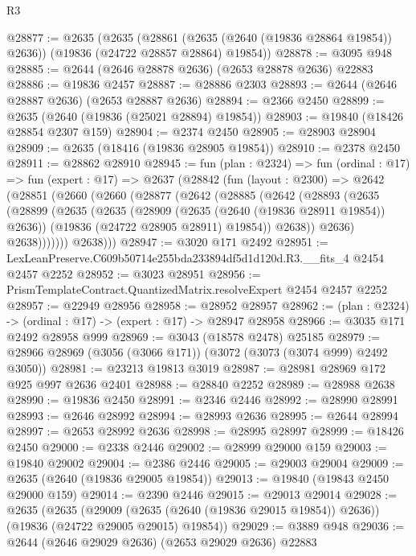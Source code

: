 \begin{lexlean}{R3}
\begin{coremodule}
@28877 := @2635
    (@2635
      (@28861 (@2635 (@2640 (@19836 @28864 @19854)) @2636))
      (@19836 (@24722 @28857 @28864) @19854))
@28878 := @3095 @948
@28885 := @2644 (@2646 @28878 @2636) (@2653 @28878 @2636) @22883
@28886 := @19836 @2457
@28887 := @28886 @2303
@28893 := @2644 (@2646 @28887 @2636) (@2653 @28887 @2636)
@28894 := @2366 @2450
@28899 := @2635 (@2640 (@19836 (@25021 @28894) @19854))
@28903 := @19840 (@18426 @28854 @2307 @159)
@28904 := @2374 @2450
@28905 := @28903 @28904
@28909 := @2635 (@18416 (@19836 @28905 @19854))
@28910 := @2378 @2450
@28911 := @28862 @28910
@28945 := fun (plan : @2324) =>
  fun (ordinal : @17) =>
  fun (expert : @17) =>
  @2637
    (@28842
      (fun (layout : @2300) =>
      @2642
        (@28851
          (@2660
            (@2660
              (@28877
                (@2642
                  (@28885
                    (@2642
                      (@28893
                        (@2635
                          (@28899
                            (@2635
                              (@2635
                                (@28909 (@2635 (@2640 (@19836 @28911 @19854)) @2636))
                                (@19836 (@24722 @28905 @28911) @19854))
                              @2638))
                          @2636)
                        @2638)))))))
          @2638)))
@28947 := @3020 @171 @2492
@28951 := LexLeanPreserve.C609b50714e255bda233894df5d1d120d.R3.__fits_4 @2454 @2457 @2252
@28952 := @3023 @28951
@28956 := PrismTemplateContract.QuantizedMatrix.resolveExpert @2454 @2457 @2252
@28957 := @22949 @28956
@28958 := @28952 @28957
@28962 := (plan : @2324) -> (ordinal : @17) -> (expert : @17) -> @28947 @28958
@28966 := @3035 @171 @2492 @28958 @999
@28969 := @3043 (@18578 @2478) @25185
@28979 := @28966 @28969 (@3056 (@3066 @171)) (@3072 (@3073 (@3074 @999) @2492 @3050))
@28981 := @23213 @19813 @3019
@28987 := @28981 @28969 @172 @925 @997 @2636 @2401
@28988 := @28840 @2252
@28989 := @28988 @2638
@28990 := @19836 @2450
@28991 := @2346 @2446
@28992 := @28990 @28991
@28993 := @2646 @28992
@28994 := @28993 @2636
@28995 := @2644 @28994
@28997 := @2653 @28992 @2636
@28998 := @28995 @28997
@28999 := @18426 @2450
@29000 := @2338 @2446
@29002 := @28999 @29000 @159
@29003 := @19840 @29002
@29004 := @2386 @2446
@29005 := @29003 @29004
@29009 := @2635 (@2640 (@19836 @29005 @19854))
@29013 := @19840 (@19843 @2450 @29000 @159)
@29014 := @2390 @2446
@29015 := @29013 @29014
@29028 := @2635
    (@2635
      (@29009 (@2635 (@2640 (@19836 @29015 @19854)) @2636))
      (@19836 (@24722 @29005 @29015) @19854))
@29029 := @3889 @948
@29036 := @2644 (@2646 @29029 @2636) (@2653 @29029 @2636) @22883

\end{coremodule}
\end{lexlean}
